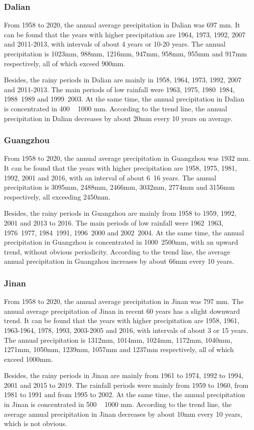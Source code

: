 \documentclass{swmcmthesis}
\begin{document}
\subsubsection{Dalian}
\hspace{1.25em}
From 1958 to 2020, the annual average precipitation in Dalian was 697 mm. It can be found that the years with higher precipitation are 1964, 1973, 1992, 2007 and 2011-2013, with intervals of about 4 years or 10-20 years. The annual precipitation is 1023mm, 988mm, 1216mm, 947mm, 958mm, 955mm and 917mm respectively, all of which exceed 900mm.
\par 
Besides, the rainy periods in Dalian are mainly in 1958, 1964, 1973, 1992, 2007 and 2011-2013. The main periods of low rainfall were 1963, 1975, 1980~1984, 1988~1989 and 1999~2003. At the same time, the annual precipitation in Dalian is concentrated in 400 ~ 1000 mm. According to the trend line, the annual precipitation in Dalian decreases by about 20mm every 10 years on average.
\subsubsection{Guangzhou}
\hspace{1.25em}
From 1958 to 2020, the annual average precipitation in Guangzhou was 1932 mm. It can be found that the years with higher precipitation are 1958, 1975, 1981, 1992, 2001 and 2016, with an interval of about 6~16 years. The annual precipitation is 3095mm, 2488mm, 2466mm, 3032mm, 2774mm and 3156mm respectively, all exceeding 2450mm.
\par
Besides, the rainy periods in Guangzhou are mainly from 1958 to 1959, 1992, 2001 and 2013 to 2016. The main periods of low rainfall were 1962~1963, 1976~1977, 1984~1991, 1996~2000 and 2002~2004. At the same time, the annual precipitation in Guangzhou is concentrated in 1000~2500mm, with an upward trend, without obvious periodicity. According to the trend line, the average annual precipitation in Guangzhou increases by about 66mm every 10 years.
\subsubsection{Jinan}
\hspace{1.25em}
From 1958 to 2020, the annual average precipitation in Jinan was 797 mm. The annual average precipitation of Jinan in recent 60 years has a slight downward trend. It can be found that the years with higher precipitation are 1958, 1961, 1963-1964, 1978, 1993, 2003-2005 and 2016, with intervals of about 3 or 15 years. The annual precipitation is 1312mm, 1014mm, 1024mm, 1172mm, 1040mm, 1271mm, 1050mm, 1239mm, 1057mm and 1237mm respectively, all of which exceed 1000mm.
\par 
Besides, the rainy periods in Jinan are mainly from 1961 to 1974, 1992 to 1994, 2001 and 2015 to 2019. The rainfall periods were mainly from 1959 to 1960, from 1981 to 1991 and from 1995 to 2002. At the same time, the annual precipitation in Jinan is concentrated in 500 ~ 1000 mm. According to the trend line, the average annual precipitation in Jinan decreases by about 10mm every 10 years, which is not obvious.
\end{document}
